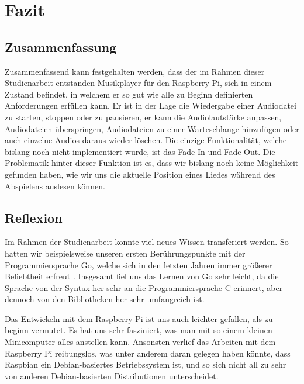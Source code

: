 
\chapter{Fazit}

\section{Zusammenfassung}
Zusammenfassend kann festgehalten werden, dass der im Rahmen dieser
Studienarbeit entstanden Musikplayer für den Raspberry Pi, sich in einem
Zustand befindet, in welchem er so gut wie alle zu Beginn definierten
Anforderungen erfüllen kann. Er ist in der Lage die Wiedergabe einer Audiodatei zu starten, stoppen oder
zu pausieren, er kann die Audiolautstärke anpassen, Audiodateien überspringen, Audiodateien
zu einer Warteschlange hinzufügen oder auch einzelne Audios daraus wieder löschen. Die
einzige Funktionalität, welche bislang noch nicht implementiert wurde, ist das
Fade-In und Fade-Out. Die Problematik hinter dieser Funktion ist
es, dass wir bislang noch keine Möglichkeit gefunden haben, wie wir uns die
aktuelle Position eines Liedes während des Abspielens auslesen können. 


\section{Reflexion}
Im Rahmen der Studienarbeit konnte viel neues Wissen transferiert werden. So
hatten wir beispielsweise unseren ersten Berührungspunkte mit der
Programmiersprache Go, welche sich in den letzten Jahren immer größerer
Beliebtheit erfreut \autocite{stack_overflow_2019}.
Insgesamt fiel uns das Lernen von Go sehr leicht, da die Sprache von der Syntax
her sehr an die Programmiersprache C erinnert, aber dennoch von den Bibliotheken her sehr umfangreich
ist. \newline

Das Entwickeln mit dem Raspberry Pi ist uns auch leichter gefallen, als zu
beginn vermutet. Es hat uns sehr fasziniert, was man mit so einem kleinen
Minicomputer alles anstellen kann. Ansonsten verlief das Arbeiten mit dem
Raspberry Pi reibungslos, was unter anderem daran gelegen haben könnte, dass
Raspbian ein Debian-basiertes Betriebssystem ist, und so sich nicht all zu sehr
von anderen Debian-basierten Distributionen unterscheidet.  \newline

